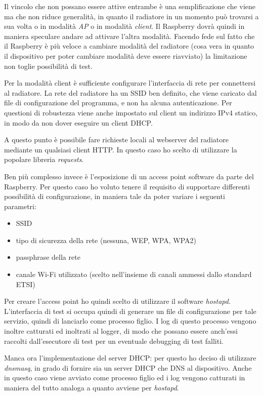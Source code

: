 \documentclass[12pt,a4paper,twoside,titlepage]{book}
\begin{document}
Il vincolo che non possano essere attive entrambe è una semplificazione che viene ma che 
non riduce generalità, in quanto il radiatore in un momento può trovarsi a sua volta o in 
modalità \textit{AP} o in modalità \textit{client}. Il Raspberry dovrà quindi in maniera 
speculare andare ad attivare l'altra modalità. Facendo fede sul fatto che il Raspberry è 
più veloce a cambiare modalità del radiatore (cosa vera in quanto il dispositivo per poter 
cambiare modalità deve essere riavviato) la limitazione non toglie possibilità di test. 

Per la modalità client è sufficiente configurare l'interfaccia di rete per connettersi
al radiatore. La rete del radiatore ha un SSID ben definito, che viene caricato dal
file di configurazione del programma, e non ha alcuna autenticazione. Per questioni
di robustezza viene anche impostato sul client un indirizzo IPv4 statico, in modo da
non dover eseguire un client DHCP.

A questo punto è possibile fare richieste locali al webserver del radiatore mediante
un qualsiasi client HTTP. In questo caso ho scelto di utilizzare la popolare
libreria \textit{requests}.

Ben più complesso invece è l'esposizione di un access point software da parte del
Raspberry. Per questo caso ho voluto tenere il requisito di supportare differenti
possibilità di configurazione, in maniera tale da poter variare i seguenti parametri:
\begin{itemize}
    \item SSID
    \item tipo di sicurezza della rete (nessuna, WEP, WPA, WPA2)
    \item passphrase della rete
    \item canale Wi-Fi utilizzato (scelto nell'insieme di canali ammessi dallo standard ETSI)
\end{itemize}

Per creare l'access point ho quindi scelto di utilizzare il software \textit{hostapd}.
L'interfaccia di test si occupa quindi di generare un file di configurazione per tale
servizio, quindi di lanciarlo come processo figlio. I log di questo processo vengono
inoltre catturati ed inoltrati al logger, di modo che possano essere anch'essi raccolti
dall'esecutore di test per un eventuale debugging di test falliti.

Manca ora l'implementazione del server DHCP: per questo ho deciso di utilizzare
\textit{dnsmasq}, in grado di fornire sia un server DHCP che DNS al dispositivo.
Anche in questo caso viene avviato come processo figlio ed i log vengono catturati
in maniera del tutto analoga a quanto avviene per \textit{hostapd}.
\end{document}
